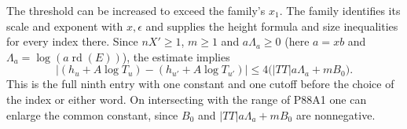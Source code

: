 The threshold can be increased to exceed the family's $x_1$.
The family identifies its scale and exponent with $x,\epsilon$
and supplies the height formula and size inequalities for every
index there. Since $nX'\ge1$, $m\ge1$ and
$a\Lambda_a\ge0$ (here $a=xb$ and
$\Lambda_a=\log(a\operatorname{rd}(E))$), the estimate implies
\[
 |(h_u+A\log T_u)-(h_{u'}+A\log T_{u'})|
          \le 4\bigl(|TT|a\Lambda_a+mB_0\bigr).
\]
This is the full ninth entry with one constant and one cutoff
before the choice of the index or either word. On intersecting
with the range of P88A1 one can enlarge the common constant,
since $B_0$ and $|TT|a\Lambda_a+mB_0$ are nonnegative.
